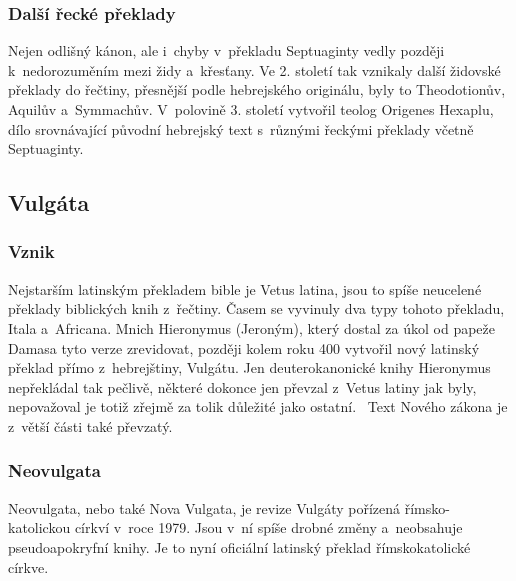 \documentclass[a4rpaper,11pt,oneside]{article}
\begin{document}
\subsubsection{Další řecké překlady}
Nejen odlišný kánon, ale i~chyby v~překladu Septuaginty vedly později k~nedorozuměním mezi židy  a~křesťany. Ve 2. století tak vznikaly další židovské překlady do řečtiny, přesnější podle hebrejského originálu, byly to Theodotionův, Aquilův a~Symmachův. V~polovině 3. století vytvořil teolog Origenes Hexaplu, dílo srovnávající původní hebrejský text s~různými řeckými překlady včetně Septuaginty.~\cite[strana 18]{cep}

\subsection{Vulgáta}
\subsubsection{Vznik}
Nejstarším latinským překladem bible je Vetus latina, jsou to spíše neucelené překlady biblických knih z~řečtiny. Časem se vyvinuly dva typy tohoto překladu, Itala a~Africana. Mnich Hieronymus (Jeroným), který dostal za úkol od papeže Damasa tyto verze zrevidovat, později kolem roku 400 vytvořil nový latinský překlad přímo z~hebrejštiny, Vulgátu. Jen deuterokanonické knihy Hieronymus nepřekládal tak pečlivě, některé dokonce jen převzal z~Vetus latiny jak byly, nepovažoval je totiž zřejmě za tolik důležité jako ostatní.~\cite[strana 18-19]{cep}  Text Nového zákona je z~větší části také převzatý.

\subsubsection{Neovulgata}
Neovulgata, nebo také Nova Vulgata, je revize Vulgáty pořízená římsko-katolickou církví v~roce 1979. Jsou v~ní spíše drobné změny a~neobsahuje pseudoapokryfní knihy. Je to nyní oficiální latinský překlad římskokatolické církve.~\cite[strana 19]{cep}
\end{document}
